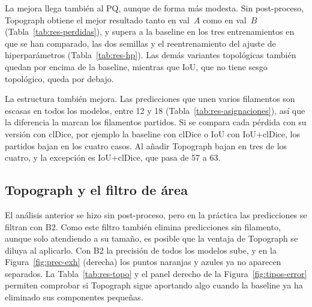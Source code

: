 La mejora llega también al PQ, aunque de forma más modesta. Sin
post-proceso, Topograph obtiene el mejor resultado tanto en val~$A$ como
en val~$B$ (Tabla~\ref{tab:res-perdidas}), y supera a la baseline en
los tres entrenamientos en que se
han comparado, las dos semillas y el reentrenamiento del ajuste de
hiperparámetros (Tabla~\ref{tab:res-hp}). Las demás variantes topológicas también quedan por
encima de la baseline, mientras que IoU, que no tiene sesgo topológico,
queda por debajo.

La estructura también mejora. Las predicciones que unen varios
filamentos son escasas en todos los modelos, entre 12 y 18
(Tabla~\ref{tab:res-asignaciones}), así que la
diferencia la marcan los filamentos partidos. Si se compara cada pérdida
con su versión con clDice, por ejemplo la baseline con clDice o IoU con
IoU+clDice, los partidos bajan en los cuatro casos. Al añadir Topograph
bajan en tres de los cuatro, y la excepción es IoU+clDice, que pasa de
57 a 63.

\subsection{Topograph y el filtro de área}
\label{sec:res-topograph}

El análisis anterior se hizo sin post-proceso, pero en la práctica las
predicciones se filtran con B2. Como este filtro también elimina
predicciones sin filamento, aunque solo atendiendo a su tamaño, es
posible que la ventaja de Topograph se diluya al aplicarlo. Con B2 la
precisión de todos los modelos sube, y en la Figura~\ref{fig:prec-exh}
(derecha) los puntos naranjas y azules ya no aparecen separados. La
Tabla~\ref{tab:res-topo} y el panel derecho de la
Figura~\ref{fig:tipos-error} permiten comprobar si Topograph sigue
aportando algo cuando la baseline ya ha eliminado sus componentes
pequeñas.

